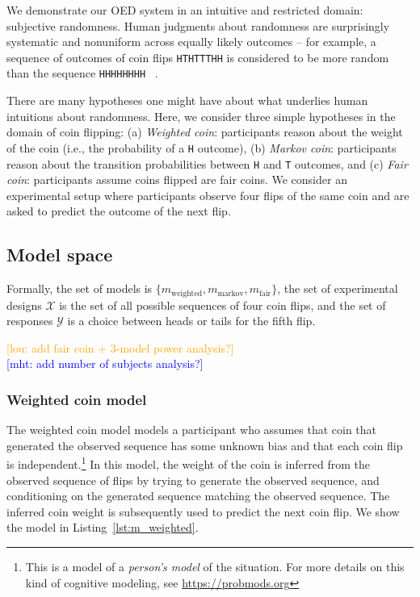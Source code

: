 \documentclass{article}
\newcommand{\mht}[1]{\textcolor{Blue}{[mht: #1]}}
\newcommand{\lou}[1]{\textcolor{orange}{[lou: #1]}}
\begin{document}
We demonstrate our OED system in an intuitive and restricted domain: subjective randomness.
Human judgments about randomness are surprisingly systematic and nonuniform across equally likely outcomes -- for example, a sequence of outcomes of coin flips \lstinline{HTHTTTHH} is considered to be more random than the sequence \lstinline{HHHHHHHH} ~\cite{goodfellow38:jep, griffiths01:cogsci}.

There are many hypotheses one might have about what underlies human intuitions about randomness.
Here, we consider three simple hypotheses in the domain of coin flipping: (a) \emph{Weighted coin}: participants reason about the weight of the coin (i.e., the probability of a \lstinline{H} outcome), (b) \emph{Markov coin}: participants reason about the transition probabilities between \lstinline{H} and \lstinline{T} outcomes, and (c) \emph{Fair coin}: participants assume coins flipped are fair coins.
We consider an experimental setup where participants observe four flips of the same coin and are asked to predict the outcome of the next flip.


\subsection{Model space}


Formally, the set of models is $\{m_{\text{weighted}}, m_{\text{markov}}, m_{\text{fair}}\}$, the set of experimental designs $\mathcal{X}$ is the set of all possible sequences of four coin flips, and the set of responses $\mathcal{Y}$ is a choice between heads or tails for the fifth flip.

\lou{add fair coin + 3-model power analysis?}\\
\mht{add number of subjects analysis?}

\subsubsection{Weighted coin model}
\label{s:tutorial:sss:biased}

The weighted coin model models a participant who assumes that coin that generated the observed sequence has some unknown bias and that each coin flip is independent.\footnote{This is a model of a \emph{person's model} of the situation. For more details on this kind of cognitive modeling, see \url{https://probmods.org}}
In this model, the weight of the coin is inferred from the observed sequence of flips by trying to generate the observed sequence, and conditioning on the generated sequence matching the observed sequence.
The inferred coin weight is subsequently used to predict the next coin flip. We show the model in Listing~\ref{lst:m_weighted}.
\end{document}
